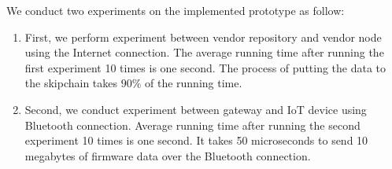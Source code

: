 We conduct two experiments on the implemented prototype as follow:
\begin{enumerate}
	\item First, we perform experiment between vendor repository and vendor node using the Internet connection. The average running time after running the first experiment 10 times is one second. The process of putting the data to the skipchain takes $90\%$ of the running time.
	\item Second, we conduct experiment between gateway and IoT device using Bluetooth connection. Average running time after running the second experiment 10 times is one second. It takes 50 microseconds to send 10 megabytes of firmware data over the Bluetooth connection.
\end{enumerate} 
